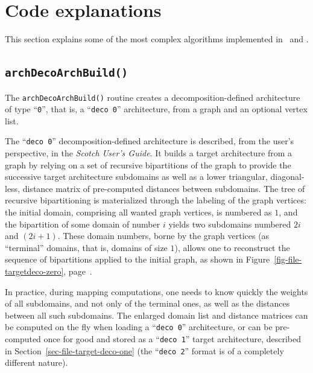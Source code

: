 
\section{Code explanations}
\label{sec-code}

This section explains some of the most complex algorithms implemented
in \scotch\ and \ptscotch.

\subsection{\texttt{archDecoArchBuild()}}

The \texttt{archDecoArchBuild()} routine creates a
decomposition-defined architecture of type ``\texttt{0}'', that is, a
``\texttt{deco~0}'' architecture, from a graph and an optional vertex
list.

The ``\texttt{deco~0}'' decomposition-defined architecture is
described, from the user's perspective, in the \textit{Scotch User's
Guide}. It builds a target architecture from a graph by relying on
a set of recursive bipartitions of the graph to provide the successive
target architecture subdomains as well as a lower triangular,
diagonal-less, distance matrix of pre-computed distances
between subdomains. The tree of recursive bipartitioning is
materialized through the labeling of the graph vertices: the initial
domain, comprising all wanted graph vertices, is numbered as $1$, and
the bipartition of some domain of number $i$ yields two subdomains
numbered $2i$ and $(2i+1)$. These domain numbers, borne by the graph
vertices (as ``terminal'' domains, that is, domains of size $1$),
allows one to reconstruct the sequence of bipartitions applied to the
initial graph, as shown in Figure~\ref{fig-file-targetdeco-zero},
page~\pageref{fig-file-targetdeco-zero}.

In practice, during mapping computations, one needs to know quickly
the weights of all subdomains, and not only of the terminal ones, as
well as the distances between all such subdomains. The enlarged domain
list and distance matrices can be computed on the fly when loading a 
``\texttt{deco~0}'' architecture, or can be pre-computed once for good
and stored as a ``\texttt{deco~1}'' target architecture, described
in Section~\ref{sec-file-target-deco-one} (the ``\texttt{deco~2}''
format is of a completely different nature).

